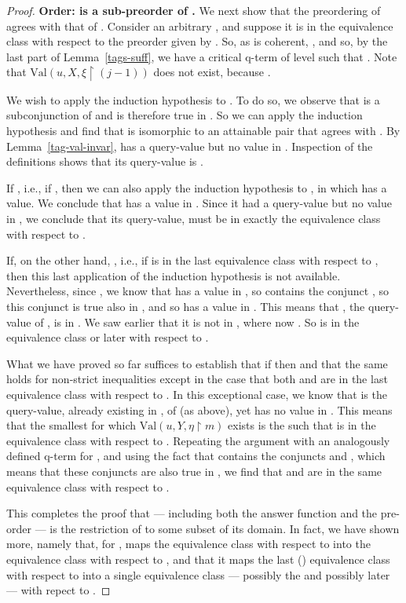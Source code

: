 \documentclass{LMCS}
\theoremstyle{definition}
\newcommand{\restr}{\mathop{\upharpoonright}}
\newcommand{\val}[3]{\ensuremath{\text{Val}(#1,#2,#3)}}
\begin{document}
\begin{proof}
\medskip\noindent\textbf{Order:  is a sub-preorder of
.} We next show that the preordering of  agrees with
that of .  Consider an arbitrary , and
suppose it is in the  equivalence class with respect to the
preorder given by .  So, as  is coherent,
, and so, by the last part of
Lemma~\ref{tags-suff}, we have a critical q-term  of level 
such that .  Note that \val
uX{\xi\restr(j-1)} does not exist, because
.

We wish to apply the induction hypothesis to .  To
do so, we observe that  is a subconjunction
of  and is therefore true in .  So we can
apply the induction hypothesis and find that  is
isomorphic to an attainable pair that agrees with
.  By Lemma~\ref{tag-val-invar},  has a
query-value but no value in .  Inspection of the
definitions shows that its query-value is .

If , i.e., if , then we can also apply the
induction hypothesis to , in which  has a value.
We conclude that  has a value in .  Since it had
a query-value but no value in , we conclude that
its query-value,  must be in exactly the  equivalence
class with respect to .

If, on the other hand, , i.e., if  is in the last equivalence
class with respect to , then this last application of the
induction hypothesis is not available.  Nevertheless, since
, we know that  has a value in , so
 contains the conjunct , so this conjunct is true
also in , and so  has a value in .  This means
that , the query-value of , is in .  We saw
earlier that it is not in , where now
.  So  is in the  equivalence class or later with
respect to .

What we have proved so far suffices to establish that if 
then  and that the same holds for non-strict
inequalities except in the case that both  and  are in the last
equivalence class with respect to .  In this exceptional case, we
know that  is the query-value, already existing in
, of  (as above), yet  has no value in
. This means that the smallest  for which \val
uY{\eta\restr m} exists is the  such that  is in the 
equivalence class with respect to .  Repeating the argument with
an analogously defined q-term  for , and using the fact that
 contains the conjuncts  and , which means that these conjuncts are also true in , we
find that  and  are in the same equivalence class with
respect to .

This completes the proof that  --- including both the answer
function and the pre-order --- is the restriction of  to some
subset of its domain.  In fact, we have shown more, namely that, for
,  maps the  equivalence class with respect to 
into the  equivalence class with respect to , and that it
maps the last () equivalence class with respect to  into a
single equivalence class --- possibly the  and possibly later
--- with repect to .


\end{proof}
\end{document}
